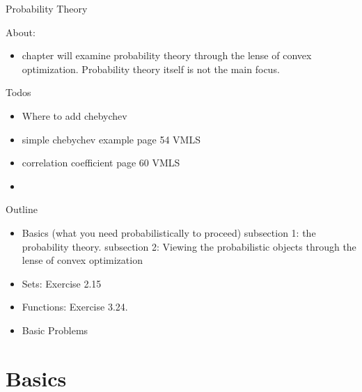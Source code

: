 \begin{chapter}{Probability Theory}

    About:
    \begin{itemize}
        \item chapter will examine probability theory through the lense of convex optimization.
        Probability theory itself is not the main focus. 
    \end{itemize}

    \noindent Todos
    \begin{itemize}
        \item Where to add chebychev
        \item simple chebychev example page 54 VMLS
        \item correlation coefficient page 60 VMLS
        \item 
    \end{itemize}

    \noindent Outline
    \begin{itemize}
        \item Basics (what you need probabilistically to proceed) subsection 1: the probability theory.
        subsection 2: Viewing the probabilistic objects through the lense of convex optimization
        \item Sets: Exercise 2.15
        \item Functions: Exercise 3.24.
        \item Basic Problems
    \end{itemize}
    
    \section{Basics}

\end{chapter}
